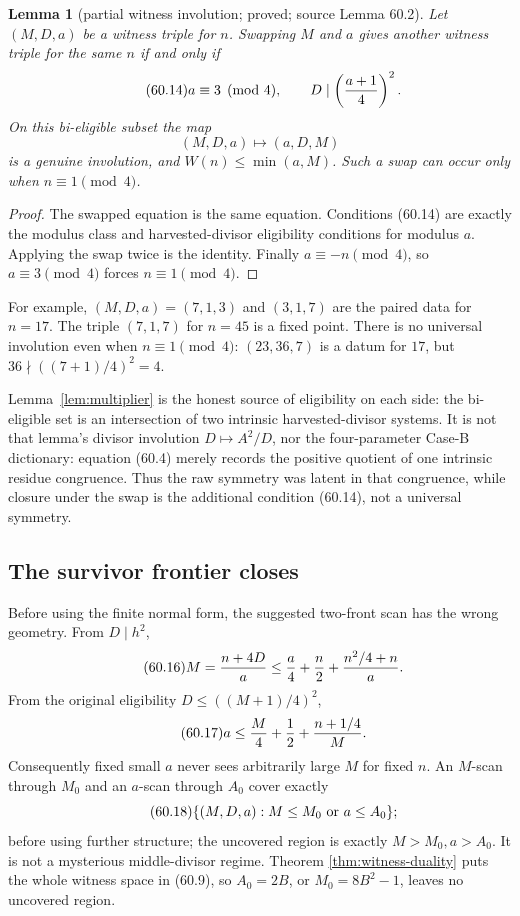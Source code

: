 \documentclass[10pt,reqno]{amsart}
\newtheorem{lemma}[theorem]{Lemma}
\theoremstyle{definition}
\newcommand{\1}{\mathbf 1}
\begin{document}
\begin{lemma}[partial witness involution; proved; source Lemma 60.2]
\label{lem:witness-involution}
Let $(M,D,a)$ be a witness triple for $n$.  Swapping $M$ and $a$ gives
another witness triple for the same $n$ if and only if
\begin{equation}\tag{60.14}
 a\equiv3\pmod4,\qquad D\mid\left({a+1\over4}\right)^2.
\end{equation}
On this bi-eligible subset the map
\begin{equation}\tag{60.15}
 (M,D,a)\longmapsto(a,D,M)
\end{equation}
is a genuine involution, and $W(n)\leq\min(a,M)$.  Such a swap can occur
only when $n\equiv1\pmod4$.
\end{lemma}
\begin{proof}
The swapped equation is the same equation.  Conditions (60.14) are exactly
the modulus class and harvested-divisor eligibility conditions for modulus
$a$.  Applying the swap twice is the identity.  Finally
$a\equiv-n\pmod4$, so $a\equiv3\pmod4$ forces $n\equiv1\pmod4$.
\end{proof}
For example, $(M,D,a)=(7,1,3)$ and $(3,1,7)$ are the paired data for
$n=17$.  The triple $(7,1,7)$ for $n=45$ is a fixed point.  There is no
universal involution even when $n\equiv1\pmod4$: $(23,36,7)$ is a datum for
$17$, but $36\nmid((7+1)/4)^2=4$.

Lemma~\ref{lem:multiplier} is the honest source of eligibility on each side:
the bi-eligible set is an intersection of two intrinsic harvested-divisor
systems.  It is not that lemma's divisor involution $D\mapsto A^2/D$, nor
the four-parameter Case-B dictionary: equation (60.4) merely records the
positive quotient of one intrinsic residue congruence.  Thus the raw
symmetry was latent in that congruence, while closure under the swap is the
additional condition (60.14), not a universal symmetry.

\subsection{The survivor frontier closes}
Before using the finite normal form, the suggested two-front scan has the
wrong geometry.  From $D\mid h^2$,
\begin{equation}\tag{60.16}
 M={n+4D\over a}\leq {a\over4}+{n\over2}+{n^2/4+n\over a}.
\end{equation}
From the original eligibility $D\leq((M+1)/4)^2$,
\begin{equation}\tag{60.17}
 a\leq {M\over4}+{1\over2}+{n+1/4\over M}.
\end{equation}
Consequently fixed small $a$ never sees arbitrarily large $M$ for fixed
$n$.  An $M$-scan through $M_0$ and an $a$-scan through $A_0$ cover exactly
\begin{equation}\tag{60.18}
 \{(M,D,a):M\leq M_0\ \hbox{or}\ a\leq A_0\};
\end{equation}
before using further structure; the uncovered region is exactly
$M>M_0,a>A_0$.  It is not a mysterious middle-divisor regime.  Theorem
\ref{thm:witness-duality} puts the whole witness space in (60.9), so
$A_0=2B$, or $M_0=8B^2-1$, leaves no uncovered region.
\end{document}
